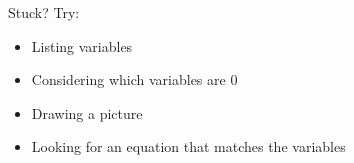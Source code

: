 \documentclass[12pt]{article}
\begin{document}
Stuck? Try:
\begin{itemize}
    \setlength\itemsep{0em} %
    \item Listing variables
    \item Considering which variables are 0
    \item Drawing a picture
    \item Looking for an equation that matches the variables
\end{itemize}
\end{document}
